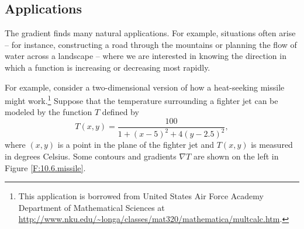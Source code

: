 \vspace*{5pt}
\nin {}
\vspace*{5pt}




  
%

\subsection*{Applications}

The gradient finds many natural applications.  For example, situations often arise -- for instance, constructing a road through the mountains or planning the flow of water across a landscape -- where we are
interested in knowing the direction in which a function is increasing
or decreasing most rapidly. 

For example, consider a two-dimensional version of how a heat-seeking
missile might work.\footnote{This application is borrowed from United
  States Air Force Academy Department of Mathematical Sciences at
  \url{http://www.nku.edu/~longa/classes/mat320/mathematica/multcalc.htm}.}
Suppose that the temperature surrounding a fighter jet can be
modeled by the function $T$ defined by
\[T(x,y) = \frac{100}{1+(x-5)^2 + 4(y-2.5)^2},\] where $(x,y)$ is a
point in the plane of the fighter jet and $T(x,y)$ is measured in
degrees 
Celsius.  Some contours and gradients $\nabla T$ are shown on
the left in Figure \ref{F:10.6.missile}.

